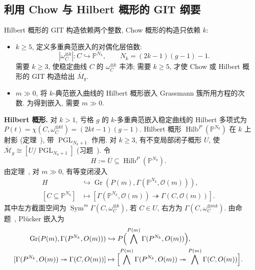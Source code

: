 \subsection{利用 Chow 与 Hilbert 概形的 GIT 纲要}\label{src:6.8.1-subsection}
Hilbert 概形的 GIT 构造依赖两个整数, Chow 概形的构造只依赖 $k$:
\begin{itemize}
\item $k\geq5$, 定义多重典范嵌入的对偶化层倍数:
\[
|\omega_C^{\otimes k}|:C\hookrightarrow\mathbb P^{N_k},\qquad N_k=(2k-1)(g-1)-1.
\]
需要 $k\geq3$, 使稳定曲线 $C$ 的 $\omega_C^{\otimes k}$ 丰沛; 需要 $k\geq5$, 才使 Chow 或 Hilbert 概形的 GIT 构造给出 $\overline M_g$.
\item $m\gg0$, 将 $k$-典范嵌入曲线的 Hilbert 概形嵌入 Grassmann 簇所用方程的次数. 为得到嵌入, 需要 $m\gg0$.
\end{itemize}
\noindent\textbf{Hilbert 概形.} 对 $k>1$, 亏格 $g$ 的 $k$-多重典范嵌入稳定曲线的 Hilbert 多项式为 $P(t)=\chi(C,\allowbreak \omega_C^{\otimes kt})=(2kt-1)(g-1)$. Hilbert 概形 $\operatorname{Hilb}^P(\mathbb P^{N_k})$ 在 $k$ 上射影 (定理~), 带 $\operatorname{PGL}_{N_k+1}$ 作用. 对 $k\geq3$, 有不变局部闭子概形 $U$, 使 $\overline{\mathcal M}_g\cong[U/\operatorname{PGL}_{N_k+1}]$ (习题~). 令
\begin{equation}\label{src:6.8.1}
H:=\overline U\subseteq\operatorname{Hilb}^P(\mathbb P^{N_k}).
\end{equation}
由定理~, 对 $m\gg0$, 有等变闭浸入
\[
\begin{aligned}
H&\hookrightarrow\operatorname{Gr}(P(m),\Gamma(\mathbb P^{N_k},\mathcal O(m))),\\
[C\subseteq\mathbb P^{N_k}]&\mapsto[\Gamma(\mathbb P^{N_k},\mathcal O(m))\twoheadrightarrow\Gamma(C,\mathcal O(m))].
\end{aligned}
\]
其中左方截面空间为 $\operatorname{Sym}^m\Gamma(C,\allowbreak \omega_C^{\otimes k})$, 若 $C\in U$, 右方为 $\Gamma(C,\allowbreak \omega_C^{\otimes mk})$. 由命题~, Plücker 嵌入为
\[
\begin{aligned}
\operatorname{Gr}(P(m),\Gamma(\mathbb P^{N_k},\mathcal O(m)))&\hookrightarrow\mathbb P\Bigl(\bigwedge^{P(m)}\Gamma(\mathbb P^{N_k},\mathcal O(m))\Bigr),\\
[\Gamma(\mathbb P^{N_k},\mathcal O(m))\twoheadrightarrow\Gamma(C,\mathcal O(m))]
&\mapsto\Bigl[\bigwedge^{P(m)}\Gamma(\mathbb P^{N_k},\mathcal O(m))\twoheadrightarrow\bigwedge^{P(m)}\Gamma(C,\mathcal O(m))\Bigr].
\end{aligned}
\]
